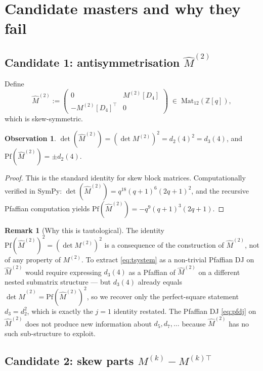 \documentclass[11pt]{article}
\theoremstyle{definition}
\newtheorem{remark}[theorem]{Remark}
\newtheorem{observation}[theorem]{Observation}
\begin{document}
\section{Candidate masters and why they fail}

\subsection{Candidate 1: antisymmetrisation $\hat M^{(2)}$}

Define
\[
\hat M^{(2)} := \begin{pmatrix} 0 & M^{(2)}[D_4]\\ -M^{(2)}[D_4]^\top & 0 \end{pmatrix}
\;\in\; \mathrm{Mat}_{12}(\mathbb{Z}[q]),
\]
which is skew-symmetric.

\begin{observation}
$\det(\hat M^{(2)}) = (\det M^{(2)})^2 = d_2(4)^2 = d_3(4)$, and
$\mathrm{Pf}(\hat M^{(2)}) = \pm d_2(4)$.
\end{observation}

\begin{proof}
This is the standard identity for skew block matrices. Computationally
verified in SymPy: $\det(\hat M^{(2)}) = q^{18}(q+1)^6(2q+1)^2$, and the
recursive Pfaffian computation yields $\mathrm{Pf}(\hat M^{(2)}) = -q^9(q+1)^3(2q+1)$.
\end{proof}

\begin{remark}[Why this is tautological]
The identity $\mathrm{Pf}(\hat M^{(2)})^2 = (\det M^{(2)})^2$ is a consequence of
the construction of $\hat M^{(2)}$, not of any property of $M^{(2)}$. To extract
\eqref{eq:tsystem} as a non-trivial Pfaffian DJ on $\hat M^{(2)}$ would
require expressing $d_3(4)$ as a Pfaffian of $\hat M^{(2)}$ on a different
nested submatrix structure --- but $d_3(4)$ already equals $\det \hat M^{(2)} =
\mathrm{Pf}(\hat M^{(2)})^2$, so we recover only the perfect-square statement
$d_3 = d_2^2$, which is exactly the $j=1$ identity restated. The Pfaffian DJ
\eqref{eq:pfdj} on $\hat M^{(2)}$ does not produce new information about $d_5,
d_7, \ldots$ because $\hat M^{(2)}$ has no such sub-structure to exploit.
\end{remark}

\subsection{Candidate 2: skew parts $M^{(k)} - M^{(k)\top}$}
\end{document}
